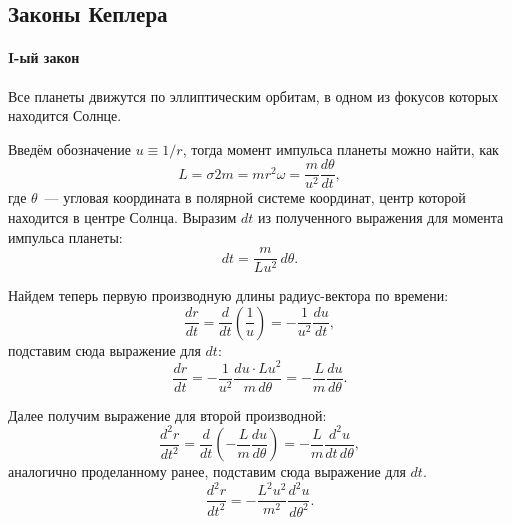 \subsection{Законы Кеплера}
\paragraph{I-ый закон} Все планеты движутся по
эллиптическим орбитам, в одном из фокусов которых
находится Солнце.

Введём обозначение $u \equiv 1/r$, тогда момент импульса планеты можно найти, как
\begin{equation*}
	L = \sigma 2 m = m r^2 \omega = \frac{m}{u^2} \frac{d \theta}{d t},
\end{equation*}
где $\theta$~--- угловая координата в полярной системе координат, центр которой находится в центре Солнца.
Выразим $dt$ из полученного выражения для момента импульса планеты:
\begin{equation*}
	dt = \frac{m}{L u^2} \, d\theta.
\end{equation*}

Найдем теперь первую производную длины радиус-вектора по времени:
\begin{equation*}
	\frac{d r}{d t} = \frac{d}{d t} \left( \frac{1}{u} \right) = - \frac{1}{u^2} \frac{du}{dt},
\end{equation*}
подставим сюда выражение для $dt$:
\begin{equation*}
	\frac{d r}{d t} = - \frac{1}{u^2} \frac{du \cdot L u^2}{m \, d \theta} = - \frac{L}{m} \frac{d u}{d \theta}.
\end{equation*}

Далее получим выражение для второй производной:
\begin{equation*}
	\frac{d^2 r}{dt^2} = \frac{d}{dt} \left( - \frac{L}{m} \frac{d u}{d \theta} \right) = -\frac{L}{m} \frac{d^2 u}{dt \, d \theta},
\end{equation*}
аналогично проделанному ранее, подставим сюда выражение для $dt$.
\begin{equation*}
	\frac{d^2 r}{dt^2} = - \frac{L^2	 u^2}{m^2} \frac{d^2 u}{d \theta^2}.
\end{equation*}


